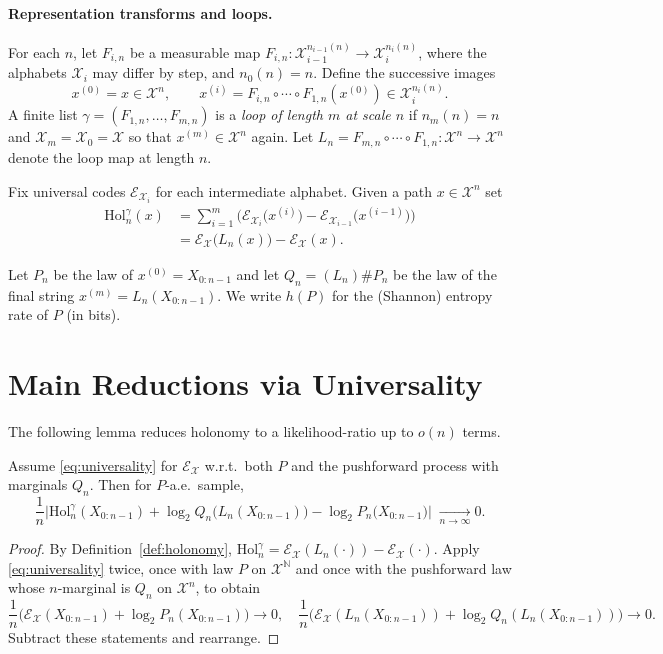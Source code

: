 \documentclass[11pt]{article}
\newcommand{\X}{\mathcal{X}}
\newcommand{\N}{\mathbb{N}}
\newcommand{\1}{\mathbbm{1}}
\newcommand{\code}{\mathcal{E}}
\newcommand{\push}{\#}
\begin{document}
\paragraph{Representation transforms and loops.}
For each $n$, let $F_{i,n}$ be a measurable map $F_{i,n}:\X_{i-1}^{n_{i-1}(n)}\to\X_i^{n_i(n)}$, where the alphabets $\X_i$ may differ by step, and $n_0(n)=n$.
Define the successive images
\[
x^{(0)} = x \in \X^n,\qquad x^{(i)} = F_{i,n}\circ\cdots\circ F_{1,n}(x^{(0)}) \in \X_i^{n_i(n)}.
\]
A finite list $\gamma=(F_{1,n},\ldots,F_{m,n})$ is a \emph{loop of length $m$ at scale $n$} if $n_m(n)=n$ and $\X_m=\X_0=\X$ so that $x^{(m)}\in\X^n$ again.
Let $L_n=F_{m,n}\circ\cdots\circ F_{1,n}:\X^n\to\X^n$ denote the loop map at length $n$.

\begin{definition}\label{def:holonomy}
Fix universal codes $\code_{\X_i}$ for each intermediate alphabet.
Given a path $x\in\X^n$ set
\begin{align*}
\mathrm{Hol}_n^\gamma(x)
  &= \sum_{i=1}^m \Big(\code_{\X_i}\big(x^{(i)}\big) - \code_{\X_{i-1}}\big(x^{(i-1)}\big)\Big)\\
  &= \code_{\X}\big(L_n(x)\big) - \code_{\X}(x).
\end{align*}
\end{definition}

Let $P_n$ be the law of $x^{(0)}=X_{0:n-1}$ and let $Q_n = (L_n)\push P_n$ be the law of the final string $x^{(m)}=L_n(X_{0:n-1})$.
We write $h(P)$ for the (Shannon) entropy rate of $P$ (in bits).

\section{Main Reductions via Universality}

The following lemma reduces holonomy to a likelihood-ratio up to $o(n)$ terms.

\begin{lemma}\label{lem:pointwise}
Assume \eqref{eq:universality} for $\code_{\X}$ w.r.t.\ both $P$ and the pushforward process with marginals $Q_n$.
Then for $P$-a.e.\ sample,
\begin{equation}\label{eq:holonomy_reduction}
\frac{1}{n}\Big|\mathrm{Hol}_n^\gamma(X_{0:n-1}) + \log_2 Q_n\big(L_n(X_{0:n-1})\big) - \log_2 P_n\big(X_{0:n-1}\big)\Big| \;\xrightarrow[n\to\infty]{} 0.
\end{equation}
\end{lemma}
\begin{proof}
By Definition~\ref{def:holonomy}, $\mathrm{Hol}_n^\gamma = \code_{\X}(L_n(\cdot)) - \code_{\X}(\cdot)$.
Apply \eqref{eq:universality} twice, once with law $P$ on $\X^\N$ and once with the pushforward law whose $n$-marginal is $Q_n$ on $\X^n$, to obtain
\[
\frac{1}{n}\Big(\code_{\X}(X_{0:n-1}) + \log_2 P_n(X_{0:n-1})\Big)\to 0,\quad
\frac{1}{n}\Big(\code_{\X}(L_n(X_{0:n-1})) + \log_2 Q_n(L_n(X_{0:n-1}))\Big)\to 0.
\]
Subtract these statements and rearrange.
\end{proof}
\end{document}
